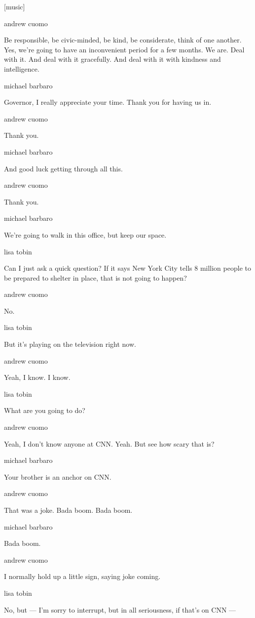 {[}music{]}

andrew cuomo

Be responsible, be civic-minded, be kind, be considerate, think of one
another. Yes, we're going to have an inconvenient period for a few
months. We are. Deal with it. And deal with it gracefully. And deal with
it with kindness and intelligence.

michael barbaro

Governor, I really appreciate your time. Thank you for having us in.

andrew cuomo

Thank you.

michael barbaro

And good luck getting through all this.

andrew cuomo

Thank you.

michael barbaro

We're going to walk in this office, but keep our space.

lisa tobin

Can I just ask a quick question? If it says New York City tells 8
million people to be prepared to shelter in place, that is not going to
happen?

andrew cuomo

No.

lisa tobin

But it's playing on the television right now.

andrew cuomo

Yeah, I know. I know.

lisa tobin

What are you going to do?

andrew cuomo

Yeah, I don't know anyone at CNN. Yeah. But see how scary that is?

michael barbaro

Your brother is an anchor on CNN.

andrew cuomo

That was a joke. Bada boom. Bada boom.

michael barbaro

Bada boom.

andrew cuomo

I normally hold up a little sign, saying joke coming.

lisa tobin

No, but --- I'm sorry to interrupt, but in all seriousness, if that's on
CNN ---

